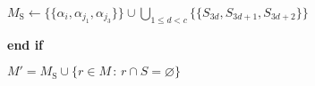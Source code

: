 \begin{breakablealgorithm}
\begin{algorithmic}

\Else %

\State $M_{\textrm{S}} \gets \{\{ \alpha_{i}, \alpha_{j_1}, \alpha_{j_3} \}\} \cup \bigcup\limits_{1 \leq d < c}\{ \{ S_{3d}, S_{3d+1}, S_{3d+2} \} \}$

\EndIf
\State \textbf{end if}

\State \Return $M' = M_{\textrm{S}} \cup \{ r \in M \,:\, r \cap S = \varnothing \}$

\medskip
\end{algorithmic}
\end{breakablealgorithm}